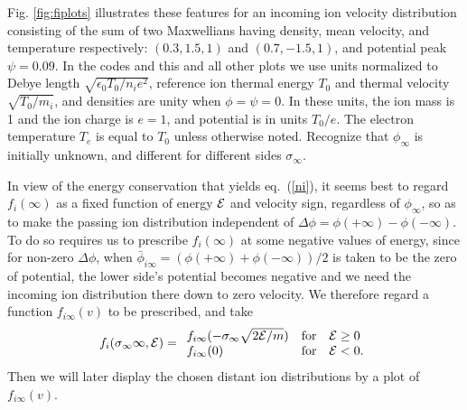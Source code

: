 \documentclass[12pt]{article}
\def\energy{{\cal E}}
\begin{document}
Fig. \ref{fig:fiplots} illustrates these features for an incoming ion
velocity distribution consisting of the sum of two Maxwellians having density,
mean velocity, and temperature respectively: $(0.3,1.5,1)$ and
$(0.7,-1.5,1)$, and potential peak $\psi=0.09$. In the codes and
this and all other plots we use units normalized to Debye length
$\sqrt{\epsilon_0T_0/n_ie^2}$, reference ion thermal energy $T_0$ and
thermal velocity $\sqrt{T_0/m_i}$, and densities are unity when
$\phi=\psi=0$. In these units, the ion mass is 1 and the ion charge is
$e=1$, and potential is in units $T_0/e$. The electron temperature
$T_e$ is equal to $T_0$ unless otherwise noted. Recognize that $\phi_\infty$ is
initially unknown, and different for different sides $\sigma_\infty$.


In view of the energy conservation that yields eq.\ (\ref{ni}), it seems
best to regard $f_{i}(\infty)$ as a fixed function of energy $\energy$
and velocity sign, regardless of $\phi_\infty$, so as to
make the passing ion distribution independent of
$\Delta\phi=\phi(+\infty)-\phi(-\infty)$. To do
so requires us to prescribe $f_i(\infty)$ at some negative values of
energy, since for non-zero $\Delta\phi$, when
$\bar\phi_{i\infty}=(\phi(+\infty)+\phi(-\infty))/2$ is taken to be
the zero of potential, the lower side's potential becomes negative and
we need the incoming ion distribution there down to zero velocity. We
therefore regard a function $f_{i\infty}(v)$ to be prescribed, and take
\begin{equation} 
  \label{eq:fiinf}
  f_i(\sigma_\infty\infty,\energy)=
  \begin{array}{ll}f_{i\infty}(-\sigma_\infty\sqrt{2\energy/m})
  & \mbox{for}\quad \energy\ge 0\\
  f_{i\infty}(0) & \mbox{for}\quad \energy< 0.
  \end{array}
\end{equation}
Then we will later display the chosen distant ion distributions by a plot of
$f_{i\infty}(v)$.
\end{document}
